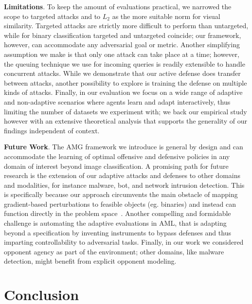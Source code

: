 \textbf{Limitations}.
To keep the amount of evaluations practical, we narrowed the scope to targeted attacks and to $L_2$ as the more suitable norm for visual similarity.
Targeted attacks are strictly more difficult to perform than untargeted, while for binary classification targeted and untargeted coincide; our framework, however, can accommodate any adversarial goal or metric.
Another simplifying assumption we make is that only one attack can take place at a time; however, the queuing technique we use for incoming queries is readily extensible to handle concurrent attacks.
While we demonstrate that our active defense does transfer between attacks, another possibility to explore is training the defense on multiple kinds of attacks.
Finally, in our evaluation we focus on a wide range of adaptive and non-adaptive scenarios where agents learn and adapt interactively, thus limiting the number of datasets we experiment with; we back our empirical study however with an extensive theoretical analysis that supports the generality of our findings independent of context.

\textbf{Future Work}.
The AMG framework we introduce is general by design and can accommodate the learning of optimal offensive and defensive policies in any domain of interest beyond image classification.
A promising path for future research is the extension of our adaptive attacks and defenses to other domains and modalities, for instance malware, bot, and network intrusion detection.
This is specifically because our approach circumvents the main obstacle of mapping gradient-based perturbations to feasible objects (eg. binaries) and instead can function directly in the problem space~\cite{pierazzi2020intriguing}.
Another compelling and formidable challenge is automating the adaptive evaluations in \gls{AML}, that is adapting beyond a specification by inventing instruments to bypass defenses and thus imparting controllability to adversarial tasks.
Finally, in our work we considered opponent agency as part of the environment; other domains, like malware detection, might benefit from explicit opponent modeling.

\section{Conclusion}

